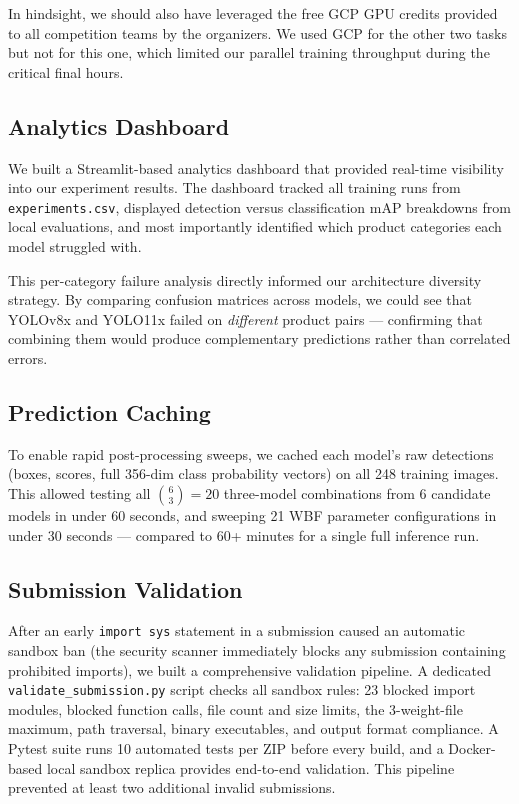 \documentclass[11pt,a4paper]{article}
\begin{document}
In hindsight, we should also have leveraged the free GCP GPU credits provided to all competition teams by the organizers.
We used GCP for the other two tasks but not for this one, which limited our parallel training throughput during the critical final hours.

\subsection{Analytics Dashboard}

We built a Streamlit-based analytics dashboard that provided real-time visibility into our experiment results.
The dashboard tracked all training runs from \texttt{experiments.csv}, displayed detection versus classification mAP breakdowns from local evaluations, and most importantly identified which product categories each model struggled with.

This per-category failure analysis directly informed our architecture diversity strategy.
By comparing confusion matrices across models, we could see that YOLOv8x and YOLO11x failed on \emph{different} product pairs --- confirming that combining them would produce complementary predictions rather than correlated errors.

\subsection{Prediction Caching}

To enable rapid post-processing sweeps, we cached each model's raw detections (boxes, scores, full 356-dim class probability vectors) on all 248 training images.
This allowed testing all $\binom{6}{3} = 20$ three-model combinations from 6 candidate models in under 60 seconds, and sweeping 21 WBF parameter configurations in under 30 seconds --- compared to 60+ minutes for a single full inference run.

\subsection{Submission Validation}

After an early \texttt{import sys} statement in a submission caused an automatic sandbox ban (the security scanner immediately blocks any submission containing prohibited imports), we built a comprehensive validation pipeline.
A dedicated \texttt{validate\_submission.py} script checks all sandbox rules: 23 blocked import modules, blocked function calls, file count and size limits, the 3-weight-file maximum, path traversal, binary executables, and output format compliance.
A Pytest suite runs 10 automated tests per ZIP before every build, and a Docker-based local sandbox replica provides end-to-end validation.
This pipeline prevented at least two additional invalid submissions.
\end{document}
